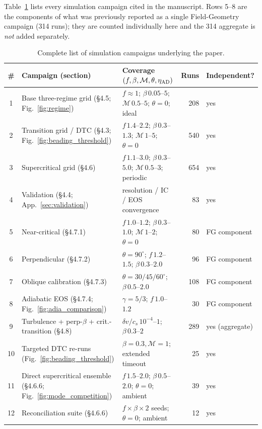 \documentclass[usenatbib,twoside,twocolumn]{mnras}
\begin{document}
Table~\ref{tab:campaigns} lists every simulation campaign cited in the manuscript. Rows 5--8 are the components of what was previously reported as a single Field-Geometry campaign (314 runs); they are counted individually here and the 314 aggregate is \emph{not} added separately.

\begin{table}
\caption{Complete list of simulation campaigns underlying the paper.}
\label{tab:campaigns}
\begin{tabular}{cllrl}
\toprule
\# & Campaign (section) & Coverage $(f,\beta,\mathcal{M},\theta,\eta_{\rm AD})$ & Runs & Independent? \\
\midrule
1  & Base three-regime grid (\S4.5; Fig.~\ref{fig:regime}) & $f\approx1$; $\beta\,0.05$--$5$; $\mathcal{M}\,0.5$--$5$; $\theta=0$; ideal & 208 & yes \\
2  & Transition grid / DTC (\S4.3; Fig.~\ref{fig:beading_threshold}) & $f\,1.4$--$2.2$; $\beta\,0.3$--$1.3$; $\mathcal{M}\,1$--$5$; $\theta=0$ & 540 & yes \\
3  & Supercritical grid (\S4.6) & $f\,1.1$--$3.0$; $\beta\,0.3$--$5.0$; $\mathcal{M}\,0.5$--$3$; periodic & 654 & yes \\
4  & Validation (\S4.4; App.~\ref{sec:validation}) & resolution / IC / EOS convergence & 83 & yes \\
5  & Near-critical (\S4.7.1) & $f\,1.0$--$1.2$; $\beta\,0.3$--$1.0$; $\mathcal{M}\,1$--$2$; $\theta=0$ & 80 & FG component \\
6  & Perpendicular (\S4.7.2) & $\theta=90^\circ$; $f\,1.2$--$1.5$; $\beta\,0.3$--$2.0$ & 96 & FG component \\
7  & Oblique calibration (\S4.7.3) & $\theta=30/45/60^\circ$; $\beta\,0.5$--$2.0$ & 108 & FG component \\
8  & Adiabatic EOS (\S4.7.4; Fig.~\ref{fig:adia_comparison}) & $\gamma=5/3$; $f\,1.0$--$1.2$ & 30 & FG component \\
9  & Turbulence + perp-$\beta$ + crit.-transition (\S4.8) & $\delta v/c_s\,10^{-4}$--$1$; $\beta\,0.3$--$2$ & 289 & yes (aggregate) \\
10 & Targeted DTC re-runs (Fig.~\ref{fig:beading_threshold}) & $\beta=0.3,\mathcal{M}=1$; extended timeout & 25 & yes \\
11 & Direct supercritical ensemble (\S4.6.6; Fig.~\ref{fig:mode_competition}) & $f\,1.5$--$2.0$; $\beta\,0.5$--$2.0$; $\theta=0$; ambient & 39 & yes \\
12 & Reconciliation suite (\S4.6.6) & $f\times\beta\times2$ seeds; $\theta=0$; ambient & 12 & yes \\

\end{tabular}
\end{table}
\end{document}

